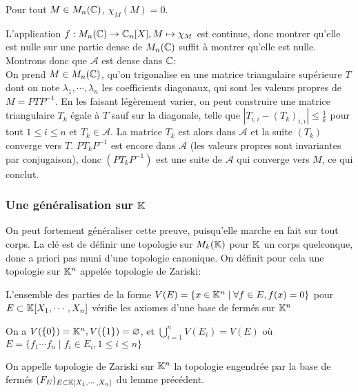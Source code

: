 \documentclass{article}
\begin{document}
\begin{theoreme}
    Pour tout $M \in M_n(\mathbb{C})$, $\chi_M(M) = 0$.
\end{theoreme}

L'application $f: M_n(\mathbb{C}) \to \mathbb{C}_n[X], M \mapsto \chi_M$ est continue, donc montrer qu'elle est nulle sur une partie dense de $M_n(\mathbb{C})$ suffit à montrer qu'elle est nulle. Montrons donc que $\mathcal{A}$ est dense dans $\mathbb{C}$:\\

On prend $M \in M_n(\mathbb{C})$, qu'on trigonalise en une matrice triangulaire supérieure $T$ dont on note $\lambda_1, \cdots, \lambda_n$ les coefficients diagonaux, qui sont les valeurs propres de $M = PTP^{-1}$. En les faisant légèrement varier, on peut construire une matrice triangulaire $T_k$ égale à $T$ sauf sur la diagonale, telle que $|T_{i,i} - (T_k)_{i, i}| \leq \frac{1}{k}$ pour tout $1 \leq i \leq n$ et $T_k \in \mathcal{A}$. La matrice $T_k$ est alors dans $\mathcal{A}$ et la suite $(T_k)$ converge vers $T$. $PT_kP^{-1}$ est encore dans $\mathcal{A}$ (les valeurs propres sont invariantes par conjugaison), donc $(PT_kP^{-1})$ est une suite de $\mathcal{A}$ qui converge vers $M$, ce qui conclut.\\

\subsubsection{Une généralisation sur $\mathbb{K}$}

On peut fortement généraliser cette preuve, puisqu'elle marche en fait sur tout corps. La clé est de définir une topologie sur $M_k(\mathbb{K})$ pour $\mathbb{K}$ un corps quelconque, donc a priori pas muni d'une topologie canonique. On définit pour cela une topologie sur $\mathbb{K}^n$ appelée topologie de Zariski:

\begin{lemme}
    L'ensemble des parties de la forme $V(E) = \{x \in \mathbb{K}^n \mid \forall f \in E, f(x) = 0 \}$ pour $E \subset \mathbb{K}[X_1, \cdots, X_n]$ vérifie les axiomes d'une base de fermés sur $\mathbb{K}^n$
\end{lemme}

\begin{preuve}
    On a $V(\{0\}) = \mathbb{K}^n, V(\{1\}) = \varnothing$, et $\bigcup_{i=1}^{n}{V(E_i)} = V(E)$ où $E = \{f_1\cdots f_n \mid f_i \in E_i, 1 \leq i \leq n\}$
\end{preuve}

\begin{definition}
    On appelle topologie de Zariski sur $\mathbb{K}^n$ la topologie engendrée par la base de fermés $(F_E)_{E \subset  \mathbb{K}[X_1, \cdots, X_n]}$ du lemme précédent.
\end{definition}
\end{document}
